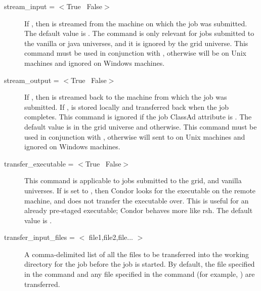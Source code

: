 \begin{description}
\item[stream\_input = $<$True \Bar\ False$>$]
If , then  is streamed from the
machine on which the job was submitted.
The default value is .
The command is only relevant for jobs submitted to
the vanilla or java universes, and
it is ignored by the grid
universe.
This command must be used in conjunction with 
, otherwise  will
be  on Unix machines and
ignored on Windows machines.

\item[stream\_output = $<$True \Bar\ False$>$]
If , then  is streamed back to
the machine from which the job was submitted.
If ,  is stored locally
and transferred back when the job completes.
This command is ignored if the job ClassAd attribute
 is
.
The default value is  in the grid
universe and  otherwise.
This command must be used in conjunction with 
, otherwise  will
sent to  on Unix machines and
ignored on Windows machines.


\item[transfer\_executable = $<$True \Bar\ False$>$]
This command is applicable to jobs submitted to the grid,
and vanilla universes.
If  is set to
, then Condor looks for the executable on the remote machine, and
does not transfer the executable over.
This is useful for an already pre-staged 
executable; Condor behaves more like rsh.
The default value is .


\item[transfer\_input\_files = $<$ file1,file2,file... $>$]
A comma-delimited list of all the files to be transferred into the
working directory for the job before the job is started.
By default, the file specified in the
 command and any file specified in the 
command (for example, ) are transferred.


\end{description}
